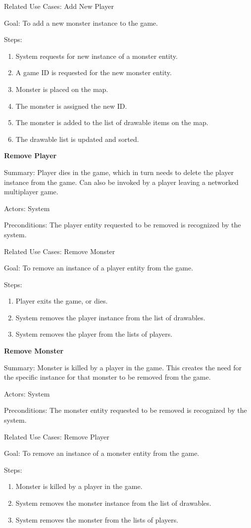 \documentclass[12pt]{report}
\begin{document}
Related Use Cases: Add New Player

Goal: To add a new monster instance to the game.

Steps:
\begin{enumerate}
	\item System requests for new instance of a monster entity.
	\item A game ID is requested for the new monster entity.
	\item Monster is placed on the map.
	\item The monster is assigned the new ID.
	\item The monster is added to the list of drawable items on the map.
	\item The drawable list is updated and sorted.
\end{enumerate}

\textbf{Remove Player}

Summary: Player dies in the game, which in turn needs to delete the player instance from the game. Can also be invoked by a player leaving a networked multiplayer game.

Actors: System

Preconditions: The player entity requested to be removed is recognized by the system.

Related Use Cases: Remove Monster

Goal: To remove an instance of a player entity from the game.

Steps:
\begin{enumerate}
	\item Player exits the game, or dies.
	\item System removes the player instance from the list of drawables.
	\item System removes the player from the lists of players.
\end{enumerate}

\textbf{Remove Monster}

Summary: Monster is killed by a player in the game. This creates the need for the specific instance for that monster to be removed from the game.

Actors: System

Preconditions: The monster entity requested to be removed is recognized by the system.

Related Use Cases: Remove Player

Goal: To remove an instance of a monster entity from the game.

Steps:
\begin{enumerate}
	\item Monster is killed by a player in the game.
	\item System removes the monster instance from the list of drawables.
	\item System removes the monster from the lists of players.
\end{enumerate}
\end{document}
